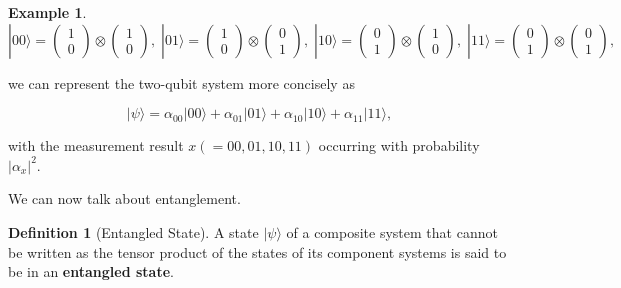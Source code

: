 \documentclass{article}
\theoremstyle{definition}
\newtheorem{example}{Example}[section]
\newtheorem{definition}{Definition}[section]
\begin{document}
\begin{example}
      \[
        |00\rangle = \begin{pmatrix} 1 \\ 0 \end{pmatrix} \otimes \begin{pmatrix} 1 \\ 0 \end{pmatrix}, \; 
        |01\rangle = \begin{pmatrix} 1 \\ 0 \end{pmatrix} \otimes \begin{pmatrix} 0 \\ 1 \end{pmatrix}, \; 
        |10\rangle = \begin{pmatrix} 0 \\ 1 \end{pmatrix} \otimes \begin{pmatrix} 1 \\ 0 \end{pmatrix}, \; 
        |11\rangle = \begin{pmatrix} 0 \\ 1 \end{pmatrix} \otimes \begin{pmatrix} 0 \\ 1 \end{pmatrix}, 
      \]

      we can represent the two-qubit system more concisely as

        \[|\psi \rangle = \alpha_{00} |00\rangle + \alpha_{01} |01\rangle + \alpha_{10} |10\rangle + \alpha_{11} |11\rangle,\]

      with the measurement result $x ( = 00, 01, 10, 11)$ occurring with probability $|\alpha_{x}|^2$.
    \end{example}

    We can now talk about entanglement. 

    \begin{definition}[Entangled State]
      A state $|\psi\rangle$ of a composite system that cannot be written as the tensor product of the states of its component systems is said to be in an \textbf{entangled state}.   
    \end{definition}
\end{document}
